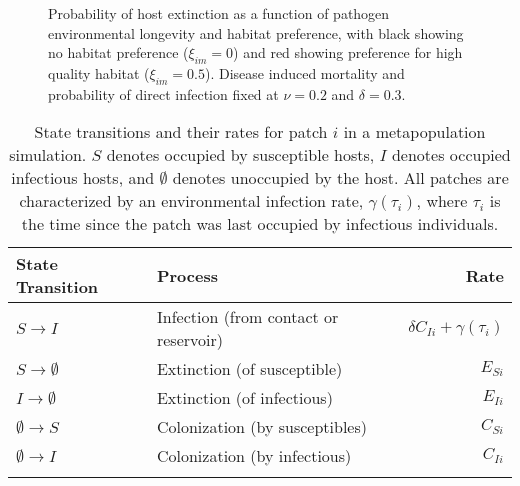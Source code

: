\documentclass{article}
\begin{document}
\begin{figure}
\centering
\caption{Probability of host extinction as a function of pathogen environmental longevity and habitat preference, with black showing no habitat preference ($\xi_{im} = 0$) and red showing preference for high quality habitat ($\xi_{im} = 0.5$).  Disease induced mortality and probability of direct infection fixed at $\nu = 0.2$ and $\delta = 0.3$.}
\label{pext}
\end{figure}
\clearpage

\begin{table}
\caption{State transitions and their rates for patch $i$ in a metapopulation simulation.  $S$ denotes occupied by  susceptible hosts, $I$ denotes occupied infectious hosts, and $\emptyset$ denotes unoccupied by the host.  All patches are characterized by an environmental infection rate, $\gamma(\tau_i)$, where $\tau_i$ is the time since the patch was last occupied by infectious individuals.}
\begin{tabular}{llr}
State Transition & Process &  Rate \\
\hline
$S \rightarrow I$ & Infection (from contact or reservoir) & $\delta C_{Ii} + \gamma(\tau_i)$\\
$S \rightarrow \emptyset $ & Extinction (of susceptible) & $E_{Si}$\\
$I \rightarrow \emptyset $ & Extinction (of infectious) &  $E_{Ii}$ \\
$\emptyset \rightarrow S$ & Colonization (by susceptibles) & $C_{Si}$\\
$\emptyset \rightarrow I$ & Colonization (by infectious) & $C_{Ii}$\\
\label{transitions}
\end{tabular}
\end{table}
\end{document}
